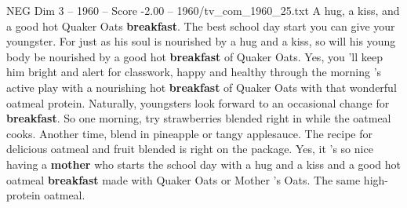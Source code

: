 \begin{textsample}{NEG Dim 3 – 1960 – Score -2.00 – 1960/tv\_com\_1960\_25.txt}  \label{ex:f3_neg_072}
A hug, a kiss, and a good hot Quaker Oats \textbf{breakfast}.
The best school day start you can give your youngster.
For just as his soul is nourished by a hug and a kiss, so will his young body be nourished by a good hot \textbf{breakfast} of Quaker Oats.
Yes, you 'll keep him bright and alert for classwork, happy and healthy through the morning 's active play with a nourishing hot \textbf{breakfast} of Quaker Oats with that wonderful oatmeal protein.
Naturally, youngsters look forward to an occasional change for \textbf{breakfast}.
So one morning, try strawberries blended right in while the oatmeal cooks.
Another time, blend in pineapple or tangy applesauce.
The recipe for delicious oatmeal and fruit blended is right on the package.
Yes, it 's so nice having a \textbf{mother} who starts the school day with a hug and a kiss and a good hot oatmeal \textbf{breakfast} made with Quaker Oats or Mother 's Oats.
The same high-protein oatmeal.

\end{textsample}

